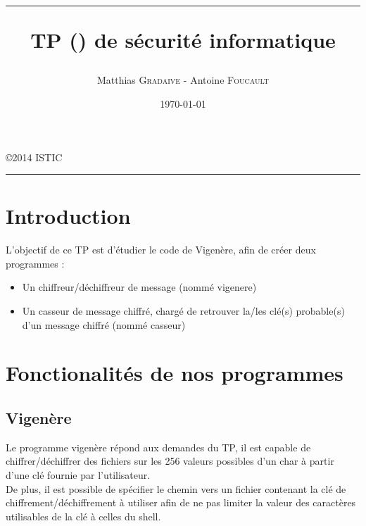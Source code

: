 \documentclass[a4paper, 11pt, oneside]{article}
\title{\hrule \vspace{1cm} TP (\no1) de sécurité informatique}
\author{Matthias \textsc{Gradaive} - Antoine \textsc{Foucault}}
\date{\today}
\begin{document}
\pagestyle{fancy}
\lhead{}
\chead{}
\rhead{\leftmark}
\cfoot{}

\clearpage
\thispagestyle{empty}

\maketitle
\begin{center}
 \copyright 2014 ISTIC\\
\end{center}
\vspace{1cm}
\hrule
\thispagestyle{empty}

\newpage

\renewcommand{\contentsname}{Sommaire}
\tableofcontents
\thispagestyle{empty}
\newpage
\setcounter{page}{1}

\section*{Introduction}

L'objectif de ce TP est d'étudier le code de Vigenère, afin de créer deux programmes :\\

\begin{itemize}
 \item Un chiffreur/déchiffreur de message (nommé vigenere)
 \item Un casseur de message chiffré, chargé de retrouver la/les clé(s) probable(s) d'un message chiffré (nommé casseur)
\end{itemize}

\section{Fonctionalités de nos programmes}

\subsection{Vigenère}

Le programme vigenère répond aux demandes du TP, il est capable de chiffrer/déchiffrer des fichiers sur les 256 valeurs possibles d'un char à partir d'une clé fournie par l'utilisateur.\\
De plus, il est possible de spécifier le chemin vers un fichier contenant la clé de chiffrement/déchiffrement à utiliser afin de ne pas limiter la valeur des caractères utilisables de la clé à celles du shell.
\end{document}
